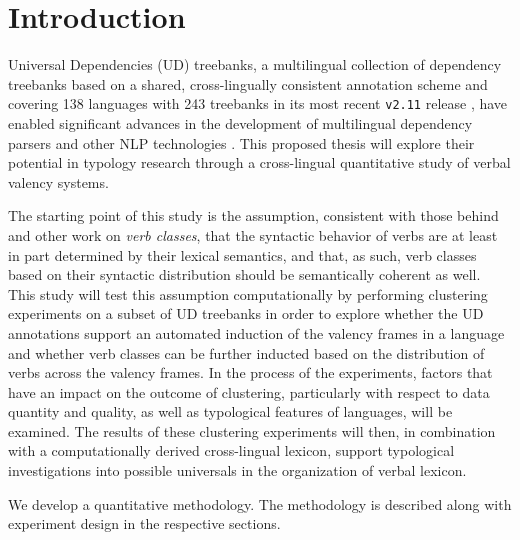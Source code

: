 \chapter{Introduction}

Universal Dependencies (UD) treebanks, a multilingual collection of dependency treebanks based on a shared, cross-lingually consistent annotation scheme \citep{nivre2020} and covering 138 languages with 243 treebanks in its most recent \texttt{v2.11} release \citep{universaldep}, have enabled significant advances in the development of multilingual dependency parsers and other NLP technologies \citep{zeman2017, zeman2018}. This proposed thesis will explore their potential in typology research through a cross-lingual quantitative study of verbal valency systems.

The starting point of this study is the assumption, consistent with those behind \citet{levin1993} and other work on \textit{verb classes}, that the syntactic behavior of verbs are at least in part determined by their lexical semantics, and that, as such, verb classes based on their syntactic distribution should be semantically coherent as well. This study will test this assumption computationally by performing clustering experiments on a subset of UD treebanks in order to explore whether the UD annotations support an automated induction of the valency frames in a language and whether verb classes can be further inducted based on the distribution of verbs across the valency frames. In the process of the experiments, factors that have an impact on the outcome of clustering, particularly with respect to data quantity and quality, as well as typological features of languages, will be examined. The results of these clustering experiments will then, in combination with a computationally derived cross-lingual lexicon, support typological investigations into possible universals in the organization of verbal lexicon.

We develop a quantitative methodology. The methodology is described along with experiment design in the respective sections.
